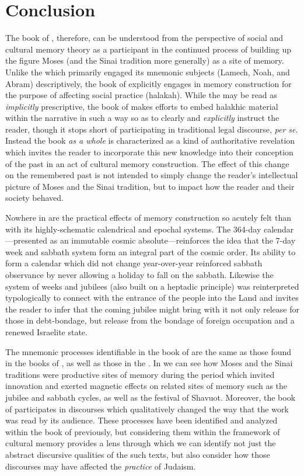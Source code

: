 
\section{Conclusion}

The book of \jub, therefore, can be understood from the perspective of social and cultural memory theory as a participant in the continued process of building up the figure Moses (and the Sinai tradition more generally) as a site of memory. Unlike the \ga which primarily engaged its mnemonic subjects (Lamech, Noah, and Abram) descriptively, the book of \jub explicitly engages in memory construction for the purpose of affecting social practice (halakah). While the \ga may be read as \emph{implicitly} prescriptive, the book of \jub makes efforts to embed halakhic material within the narrative in such a way so as to clearly and \emph{explicitly} instruct the reader, though it stops short of participating in traditional legal discourse, \emph{per se}. Instead the book \emph{as a whole} is characterized as a kind of authoritative revelation which invites the reader to incorporate this new knowledge into their conception of the past in an act of cultural memory construction. The effect of this change on the remembered past is not intended to simply change the reader's intellectual picture of Moses and the Sinai tradition, but to impact how the reader and their society behaved.

Nowhere in \jub are the practical effects of memory construction so acutely felt than with its highly-schematic calendrical and epochal systems. The 364-day calendar---presented as an immutable cosmic absolute---reinforces the idea that the 7-day week and sabbath system form an integral part of the cosmic order. Its ability to form a calendar which did not change year-over-year reinforced sabbath observance by never allowing a holiday to fall on the sabbath. Likewise the system of weeks and jubilees (also built on a heptadic principle) was reinterpreted typologically to connect with the entrance of the people into the Land and invites the reader to infer that the coming jubilee might bring with it not only release for those in debt-bondage, but release from the bondage of foreign occupation and a renewed Israelite state.

The mnemonic processes identifiable in the book of \jub are the same as those found in the books of \chronicles, as well as those in the \ga. In \jub we can see how Moses and the Sinai traditions were productive sites of memory during the \secondtemple period which invited innovation and exerted magnetic effects on related sites of memory such as the jubilee and sabbath cycles, as well as the festival of Shavuot. Moreover, the book of \jub participates in \psgraphical discourses which qualitatively changed the way that the work was read by its audience. These processes have been identified and analyzed within the book of \jub previously, but considering them within the framework of cultural memory provides a lens through which we can identify not just the abstract discursive qualities of the such texts, but also consider how those discourses may have affected the \emph{practice} of \secondtemple Judaism.